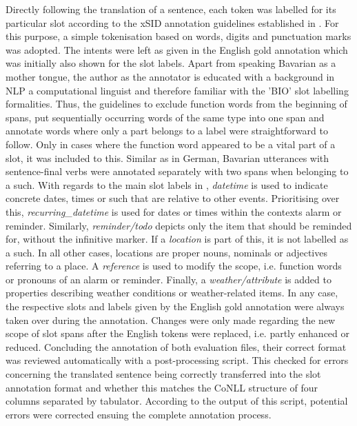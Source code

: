\documentclass[11pt,a4paper,twoside,openright]{scrbook}
\begin{document}
Directly following the translation of a sentence, each token was labelled for its particular slot according to the xSID annotation guidelines established in \citet{van-der-goot-etal-2021-masked}. For this purpose, a simple tokenisation based on words, digits and punctuation marks was adopted. The intents were left as given in the English gold annotation which was initially also shown for the slot labels. Apart from speaking Bavarian as a mother tongue, the author as the annotator is educated with a background in NLP a computational linguist and therefore familiar with the 'BIO' slot labelling formalities. Thus, the guidelines to exclude function words from the beginning of spans, put sequentially occurring words of the same type into one span and annotate words where only a part belongs to a label were straightforward to follow. Only in cases where the function word appeared to be a vital part of a slot, it was included to this. Similar as in German, Bavarian utterances with sentence-final verbs were annotated separately with two spans when belonging to a such. With regards to the main slot labels in \citet{van-der-goot-etal-2021-masked}, \textit{datetime} is used to indicate concrete dates, times or such that are relative to other events. Prioritising over this, \textit{recurring\_datetime} is used for dates or times within the contexts alarm or reminder. Similarly, \textit{reminder/todo} depicts only the item that should be reminded for, without the infinitive marker. If a \textit{location} is part of this, it is not labelled as a such. In all other cases, locations are proper nouns, nominals or adjectives referring to a place. A \textit{reference} is used to modify the scope, i.e. function words or pronouns of an alarm or reminder. Finally, a \textit{weather/attribute} is added to properties describing weather conditions or weather-related items. In any case, the respective slots and labels given by the English gold annotation were always taken over during the annotation. Changes were only made regarding the new scope of slot spans after the English tokens were replaced, i.e. partly enhanced or reduced. Concluding the annotation of both evaluation files, their correct format was reviewed automatically with a post-processing script. This checked for errors concerning the translated sentence being correctly transferred into the slot annotation format and whether this matches the CoNLL structure of four columns separated by tabulator. According to the output of this script, potential errors were corrected ensuing the complete annotation process. 
\end{document}
